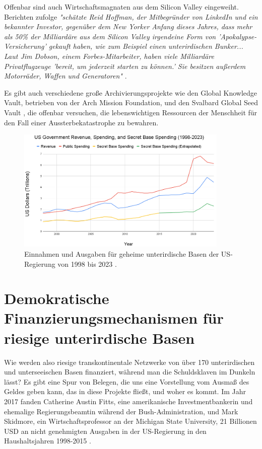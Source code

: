 \documentclass[10pt,twocolumn,letterpaper]{article}
\begin{document}
Offenbar sind auch Wirtschaftsmagnaten aus dem Silicon Valley eingeweiht. Berichten zufolge \textit{"schätzte Reid Hoffman, der Mitbegründer von LinkedIn und ein bekannter Investor, gegenüber dem New Yorker Anfang dieses Jahres, dass mehr als 50\% der Milliardäre aus dem Silicon Valley irgendeine Form von 'Apokalypse-Versicherung' gekauft haben, wie zum Beispiel einen unterirdischen Bunker... Laut Jim Dobson, einem Forbes-Mitarbeiter, haben viele Milliardäre Privatflugzeuge 'bereit, um jederzeit starten zu können.' Sie besitzen außerdem Motorräder, Waffen und Generatoren"} \cite{28}.

Es gibt auch verschiedene große Archivierungsprojekte wie den Global Knowledge Vault, betrieben von der Arch Mission Foundation, \cite{29} und den Svalbard Global Seed Vault \cite{30}, die offenbar versuchen, die lebenswichtigen Ressourcen der Menschheit für den Fall einer Aussterbekatastrophe zu bewahren.

\begin{figure}[t]
\begin{center}
\includegraphics[width=0.9\textwidth]{govcrop2.png}
\end{center}
   \caption{Einnahmen und Ausgaben für geheime unterirdische Basen der US-Regierung von 1998 bis 2023 \cite{19}.}
   \label{fig:9}
\end{figure}
\section{Demokratische Finanzierungsmechanismen für riesige unterirdische Basen}

Wie werden also riesige transkontinentale Netzwerke von über 170 unterirdischen und unterseeischen Basen finanziert, während man die Schuldsklaven im Dunkeln lässt? Es gibt eine Spur von Belegen, die uns eine Vorstellung vom Ausmaß des Geldes geben kann, das in diese Projekte fließt, und woher es kommt. Im Jahr 2017 fanden Catherine Austin Fitts, eine amerikanische Investmentbankerin und ehemalige Regierungsbeamtin während der Bush-Administration, und Mark Skidmore, ein Wirtschaftsprofessor an der Michigan State University, 21 Billionen USD an nicht genehmigten Ausgaben in der US-Regierung in den Haushaltsjahren 1998-2015 \cite{11,12,13}.
\end{document}
